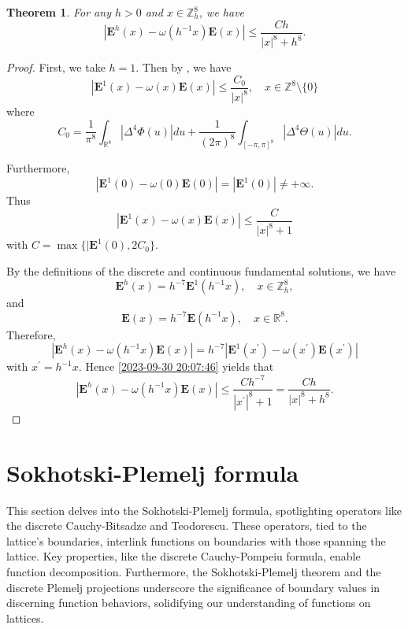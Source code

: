\documentclass{amsart}
\newtheorem{theorem}{Theorem}[section]
\theoremstyle{definition}
\theoremstyle{remark}
\numberwithin{equation}{section}
\newcommand{\R}{\mathbb{R}}
\newcommand{\Z}{\mathbb Z}
\newcommand{\E}{\bm{E}}
\begin{document}
\begin{theorem}\label{2023-09-30 19:16:04}
    For any $h > 0$ and $x \in \Z^8_h$, we have \begin{equation}
        |\E^h(x)-\omega(h^{-1}x)\E(x)|\leqslant \dfrac{Ch}{|x|^8+h^8}.
    \end{equation}
\end{theorem}

\begin{proof}
    First, we take $h = 1.$ Then by , we have \[
|\E^1(x)-\omega(x)\E(x)|\leqslant \dfrac{C_0}{|x|^8}, \quad x\in \Z^8\setminus \{0\}
\] where \[
C_0=\frac{1}{\pi^8}\int_{\R^8} |\Delta^4 \Phi(u)| du + \frac{1}{(2\pi)^8} \int_{[-\pi,\pi]^8} |\Delta^4 \Theta(u)| du.
\]

    Furthermore, \[
|\E^1(0)-\omega(0)\E(0)|=|\E^1(0)|\neq +\infty.
\]
    Thus \begin{equation}
        \label{2023-09-30 20:07:46}
        |\E^1(x)-\omega(x)\E(x)|\leqslant \dfrac{C}{|x|^8+1}
    \end{equation}  with $C=\max\{ |\E^1(0),2C_0\}.$

    By the definitions of the discrete and continuous fundamental solutions, we have \begin{equation*}
            \E^h(x)=h^{-7}\E^1(h^{-1}x), \quad x\in \Z^8_h,
    \end{equation*}
    and \begin{equation*}
            \E(x)=h^{-7}\E(h^{-1}x), \quad x\in \R^8.
    \end{equation*}
    Therefore, \[
|\E^h(x)-\omega(h^{-1}x)\E(x)|=h^{-7}|\E^1(x^\prime)-\omega(x^\prime) \E(x^\prime)|
\] with $x^\prime=h^{-1}x. $ Hence \eqref{2023-09-30 20:07:46} yields that \[
|\E^h(x)-\omega(h^{-1}x)\E(x)|\leqslant \dfrac{Ch^{-7}}{|x^\prime|^8+1}= \dfrac{Ch }{|x|^8+h^8}.
\]
\end{proof}






\section{Sokhotski-Plemelj formula}

This section delves into the Sokhotski-Plemelj formula, spotlighting operators like the discrete Cauchy-Bitsadze and Teodorescu. These operators, tied to the lattice's boundaries, interlink functions on boundaries with those spanning the lattice. Key properties, like the discrete Cauchy-Pompeiu formula, enable function decomposition. Furthermore, the Sokhotski-Plemelj theorem and the discrete Plemelj projections underscore the significance of boundary values in discerning function behaviors, solidifying our understanding of functions on lattices.
\end{document}

